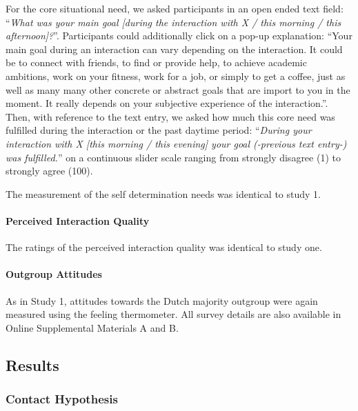 For the core situational need, we asked participants in an open ended
text field:
``\textit{What was your main goal [during the interaction with X / this morning / this afternoon]?}''.
Participants could additionally click on a pop-up explanation: ``Your
main goal during an interaction can vary depending on the interaction.
It could be to connect with friends, to find or provide help, to achieve
academic ambitions, work on your fitness, work for a job, or simply to
get a coffee, just as well as many many other concrete or abstract goals
that are import to you in the moment. It really depends on your
subjective experience of the interaction.''. Then, with reference to the
text entry, we asked how much this core need was fulfilled during the
interaction or the past daytime period:
``\textit{During your interaction with X [this morning / this evening] your goal (-previous text entry-) was fulfilled.}''
on a continuous slider scale ranging from strongly disagree (1) to
strongly agree (100).

The measurement of the self determination needs was identical to study
1.

\paragraph{Perceived Interaction Quality}

The ratings of the perceived interaction quality was identical to study
one.

\paragraph{Outgroup Attitudes}

As in Study 1, attitudes towards the Dutch majority outgroup were again
measured using the feeling thermometer. All survey details are also
available in Online Supplemental Materials A and B.




\subsection{Results}

\subsubsection{Contact Hypothesis}


